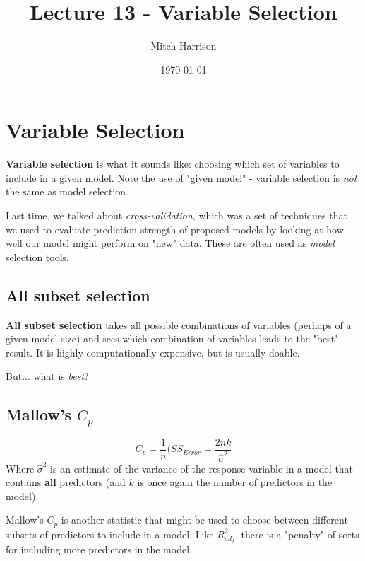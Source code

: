 \documentclass[titlepage, 12pt, leqno]{article}
\title{\Huge{Lecture 13 - Variable Selection}}
\author{\large{Mitch Harrison}}
\date{\today}
\begin{document}
\setlength{\parskip}{1\baselineskip}
\setlength{\parindent}{15pt}
\maketitle
\tableofcontents
\newpage


\section{Variable Selection}

\textbf{Variable selection} is what it sounds like: choosing which set of 
variables to include in a given model. Note the use of "given model" - 
variable selection is \textit{not} the same as model selection.

Last time, we talked about \textit{cross-validation}, which was a set of 
techniques that we used to evaluate prediction strength of proposed models by
looking at how well our model might perform on "new" data. These are often used
as \textit{model} selection tools.

\subsection{All subset selection}
\begin{definition}
    \textbf{All subset selection} takes all possible combinations of variables
    (perhaps of a given model size) and sees which combination of variables leads
    to the "best" result. It is highly computationally expensive, but is usually
    doable.
\end{definition}

But... what is \textit{best}?

\subsection{Mallow's $C_p$}
\[
    C_p = \frac{1}{n}(SS_{Error} = \frac{2nk}{\hat \sigma^2}
\]
Where $\hat \sigma^2$ is an estimate of the variance of the response variable in
a model that contains \textbf{all} predictors (and $k$ is once again the number of
predictors in the model).

Mallow's $C_p$ is another statistic that might be used to choose between different
subsets of predictors to include in a model. Like $R^2_{adj}$, there is a 
"penalty" of sorts for including more predictors in the model.
\end{document}
